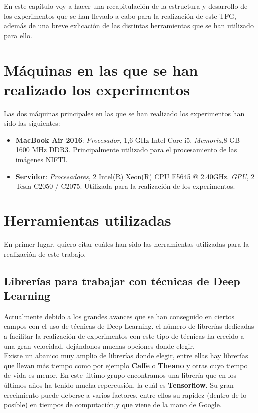 
En este capítulo voy a hacer una recapitulación de la estructura y desarrollo de los experimentos que se han llevado a cabo para la realización de este TFG, además de una breve exlicación de las distintas herramientas que se han utilizado para ello.\\

\section{Máquinas en las que se han realizado los experimentos}

Las dos máquinas principales en las que se han realizado los experimentos han sido las siguientes:
\begin{itemize}
	\item \textbf{MacBook Air 2016}: \textit{Procesador}, 1,6 GHz Intel Core i5. \textit{Memoria},8 GB 1600 MHz DDR3. Principalmente utilizado para el procesamiento de las imágenes NIFTI.
	\item \textbf{Servidor}: \textit{Procesadores}, 2 Intel(R) Xeon(R) CPU   E5645  @ 2.40GHz. \textit{GPU}, 2 Tesla C2050 / C2075. Utilizada para la realización de los experimentos.
\end{itemize}
\section{Herramientas utilizadas}

En primer lugar, quiero citar cuáles han sido las herramientas utilizadas para la realización de este trabajo.\\
\subsection{Librerías para trabajar con técnicas de Deep Learning }

Actualmente debido a los grandes avances que se han conseguido en ciertos campos con el uso de técnicas de Deep Learning. el número de librerías dedicadas a facilitar la realización de experimentos con este tipo de técnicas ha crecido a una gran velocidad, dejándonos muchas opciones donde elegir.\\

Existe un abanico muy amplio de librerías donde elegir, entre ellas hay librerías que llevan más tiempo como por ejemplo \textbf{Caffe}\cite{Caffe} o \textbf{Theano}\cite{Theano} y otras cuyo tiempo de vida es menor. En este último grupo encontramos una librería que en los últimos años ha tenido mucha repercusión, la cuál es \textbf{Tensorflow}\cite{Tensorflow}. Su gran crecimiento puede deberse a varios factores, entre ellos su rapidez (dentro de lo posible) en tiempos de computación,y que viene de la mano de Google.\\

